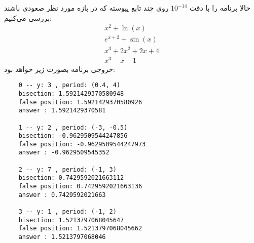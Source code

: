 \documentclass[]{article}
\begin{document}
حالا برنامه را با دقت $10^{-14}$ روی چند تابع پیوسته که در بازه مورد نظر صعودی باشند بررسی می‌کنیم:
\begin{align}
    x^2 + \ln(x) \\
    e^{x + 2} + \sin(x) \\
    x^3 + 2x^2 + 2x + 4 \\
    x^3 - x - 1
\end{align}
خروجی برنامه بصورت زیر خواهد بود:
\begin{latin}
\begin{lstlisting}
    0 -- y: 3 , period: (0.4, 4)
    bisection: 1.5921429370580948
    false position: 1.5921429370580926
    answer : 1.5921429370581
    
    1 -- y: 2 , period: (-3, -0.5)
    bisection: -0.9629509544247856
    false position: -0.9629509544247973
    answer : -0.9629509545352
    
    2 -- y: 7 , period: (-1, 3)
    bisection: 0.7429592021663112
    false position: 0.7429592021663136
    answer : 0.7429592021663
    
    3 -- y: 1 , period: (-1, 2)
    bisection: 1.5213797068045647
    false position: 1.5213797068045662
    answer : 1.5213797068046  
\end{lstlisting}
\end{latin}
\end{document}

